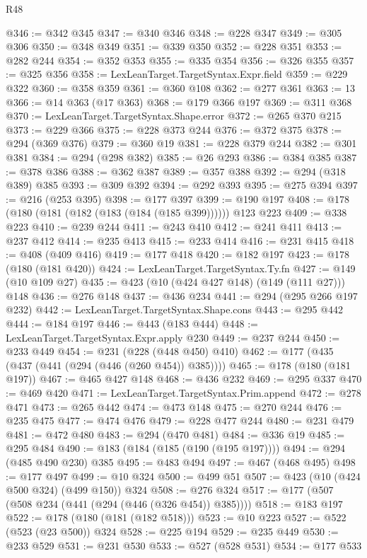 \begin{lexlean}{R48}
\begin{coremodule}
@346 := @342 @345
@347 := @340 @346
@348 := @228 @347
@349 := @305 @306
@350 := @348 @349
@351 := @339 @350
@352 := @228 @351
@353 := @282 @244
@354 := @352 @353
@355 := @335 @354
@356 := @326 @355
@357 := @325 @356
@358 := LexLeanTarget.TargetSyntax.Expr.field
@359 := @229 @322
@360 := @358 @359
@361 := @360 @108
@362 := @277 @361
@363 := 13
@366 := @14 @363 (@17 @363)
@368 := @179 @366 @197
@369 := @311 @368
@370 := LexLeanTarget.TargetSyntax.Shape.error
@372 := @265 @370 @215
@373 := @229 @366
@375 := @228 @373 @244
@376 := @372 @375
@378 := @294 (@369 @376)
@379 := @360 @19
@381 := @228 @379 @244
@382 := @301 @381
@384 := @294 (@298 @382)
@385 := @26 @293
@386 := @384 @385
@387 := @378 @386
@388 := @362 @387
@389 := @357 @388
@392 := @294 (@318 @389) @385
@393 := @309 @392
@394 := @292 @393
@395 := @275 @394
@397 := @216 (@253 @395)
@398 := @177 @397
@399 := @190 @197
@408 := @178 (@180 (@181 (@182 (@183 (@184 (@185 @399)))))) @123 @223
@409 := @338 @223
@410 := @239 @244
@411 := @243 @410
@412 := @241 @411
@413 := @237 @412
@414 := @235 @413
@415 := @233 @414
@416 := @231 @415
@418 := @408 (@409 @416)
@419 := @177 @418
@420 := @182 @197
@423 := @178 (@180 (@181 @420))
@424 := LexLeanTarget.TargetSyntax.Ty.fn
@427 := @149 (@10 @109 @27)
@435 := @423 (@10 (@424 @427 @148) (@149 (@111 @27))) @148
@436 := @276 @148
@437 := @436 @234
@441 := @294 (@295 @266 @197 @232)
@442 := LexLeanTarget.TargetSyntax.Shape.cons
@443 := @295 @442
@444 := @184 @197
@446 := @443 (@183 @444)
@448 := LexLeanTarget.TargetSyntax.Expr.apply @230
@449 := @237 @244
@450 := @233 @449
@454 := @231 (@228 (@448 @450) @410)
@462 := @177 (@435 (@437 (@441 (@294 (@446 (@260 @454)) @385))))
@465 := @178 (@180 (@181 @197))
@467 := @465 @427 @148
@468 := @436 @232
@469 := @295 @337
@470 := @469 @420
@471 := LexLeanTarget.TargetSyntax.Prim.append
@472 := @278 @471
@473 := @265 @442
@474 := @473 @148
@475 := @270 @244
@476 := @235 @475
@477 := @474 @476
@479 := @228 @477 @244
@480 := @231 @479
@481 := @472 @480
@483 := @294 (@470 @481)
@484 := @336 @19
@485 := @295 @484
@490 := @183 (@184 (@185 (@190 (@195 @197))))
@494 := @294 (@485 @490 @230) @385
@495 := @483 @494
@497 := @467 (@468 @495)
@498 := @177 @497
@499 := @10 @324
@500 := @499 @51
@507 := @423 (@10 (@424 @500 @324) (@499 @150)) @324
@508 := @276 @324
@517 := @177 (@507 (@508 @234 (@441 (@294 (@446 (@326 @454)) @385))))
@518 := @183 @197
@522 := @178 (@180 (@181 (@182 @518)))
@523 := @10 @223
@527 := @522 (@523 (@23 @500)) @324
@528 := @225 @194
@529 := @235 @449
@530 := @233 @529
@531 := @231 @530
@533 := @527 (@528 @531)
@534 := @177 @533

\end{coremodule}
\end{lexlean}
